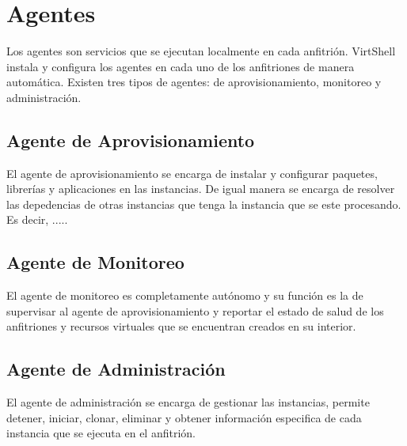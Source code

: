 \chapter{Agentes}
\label{capagents}

Los agentes son servicios que se ejecutan localmente en cada anfitrión. VirtShell instala y configura los agentes en cada uno de los anfitriones de manera automática. Existen tres tipos de agentes: de aprovisionamiento, monitoreo y administración.

\section{Agente de Aprovisionamiento}
El agente de aprovisionamiento se encarga de instalar y configurar paquetes, librerías y aplicaciones en las instancias. De igual manera se encarga de resolver las depedencias de otras instancias que tenga la instancia que se este procesando. Es decir, .....


\section{Agente de Monitoreo}
El agente de monitoreo es completamente autónomo y su función es la de supervisar al agente de aprovisionamiento y reportar el estado de salud de los anfitriones y recursos virtuales que se encuentran creados en su interior. 

\section{Agente de Administración}
El agente de administración se encarga de gestionar las instancias, permite detener, iniciar, clonar, eliminar y obtener información especifica de cada instancia que se ejecuta en el anfitrión.